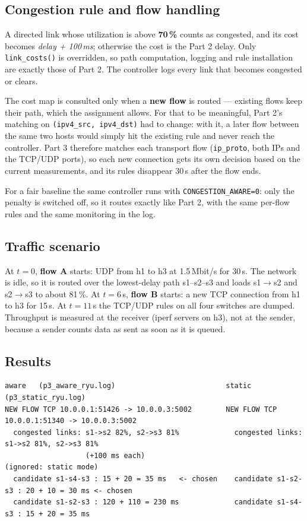 \documentclass[11pt]{article}
\begin{document}
\subsection{Congestion rule and flow handling}
A directed link whose utilization is above \textbf{70\,\%} counts as congested, and its cost becomes
\emph{delay + 100\,ms}; otherwise the cost is the Part 2 delay. Only \texttt{link\_costs()} is
overridden, so path computation, logging and rule installation are exactly those of Part 2. The
controller logs every link that becomes congested or clears.

The cost map is consulted only when a \textbf{new flow} is routed --- existing flows keep their path,
which the assignment allows. For that to be meaningful, Part 2's matching on \texttt{(ipv4\_src,
ipv4\_dst)} had to change: with it, a later flow between the same two hosts would simply hit the
existing rule and never reach the controller. Part 3 therefore matches each transport flow
(\texttt{ip\_proto}, both IPs and the TCP/UDP ports), so each new connection gets its own decision
based on the current measurements, and its rules disappear 30\,s after the flow ends.

For a fair baseline the same controller runs with \texttt{CONGESTION\_AWARE=0}: only the penalty is
switched off, so it routes exactly like Part 2, with the same per-flow rules and the same monitoring
in the log.

\subsection{Traffic scenario}
At $t=0$, \textbf{flow A} starts: UDP from h1 to h3 at 1.5\,Mbit/s for 30\,s. The network is idle, so
it is routed over the lowest-delay path s1--s2--s3 and loads s1$\to$s2 and s2$\to$s3 to about 81\,\%.
At $t=6$\,s, \textbf{flow B} starts: a new TCP connection from h1 to h3 for 15\,s. At $t=11$\,s the
TCP/UDP rules on all four switches are dumped. Throughput is measured at the receiver (iperf servers on
h3), not at the sender, because a sender counts data as sent as soon as it is queued.

\subsection{Results}
\begin{Verbatim}
aware   (p3_aware_ryu.log)                          static  (p3_static_ryu.log)
NEW FLOW TCP 10.0.0.1:51426 -> 10.0.0.3:5002        NEW FLOW TCP 10.0.0.1:51340 -> 10.0.0.3:5002
  congested links: s1->s2 82%, s2->s3 81%             congested links: s1->s2 81%, s2->s3 81%
                   (+100 ms each)                                      (ignored: static mode)
  candidate s1-s4-s3 : 15 + 20 = 35 ms   <- chosen    candidate s1-s2-s3 : 20 + 10 = 30 ms <- chosen
  candidate s1-s2-s3 : 120 + 110 = 230 ms             candidate s1-s4-s3 : 15 + 20 = 35 ms
\end{Verbatim}
\end{document}
